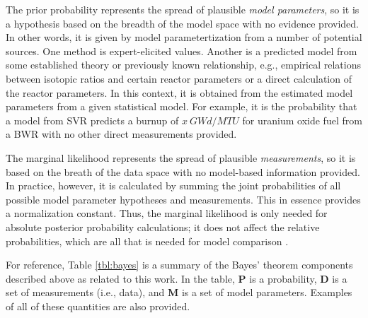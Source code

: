 The prior probability represents the spread of plausible \textit{model
parameters}, so it is a hypothesis based on the breadth of the model space with
no evidence provided.  In other words, it is given by model parametertization
from a number of potential sources.  One method is expert-elicited values.
Another is a predicted model from some established theory or previously known
relationship, e.g., empirical relations between isotopic ratios and certain
reactor parameters or a direct calculation of the reactor parameters. In this
context, it is obtained from the estimated model parameters from a given
statistical model.  For example, it is the probability that a model from
\gls{SVR} predicts a burnup of $x\ GWd/MTU$ for uranium oxide fuel from a
\gls{BWR} with no other direct measurements provided.

The marginal likelihood represents the spread of plausible
\textit{measurements}, so it is based on the breath of the data space with no
model-based information provided.  In practice, however, it is calculated by
summing the joint probabilities of all possible model parameter hypotheses and
measurements. This in essence provides a normalization constant.  Thus, the
marginal likelihood is only needed for absolute posterior probability
calculations; it does not affect the relative probabilities, which are all that
is needed for model comparison \cite{inverse_theory}. 

For reference, Table \ref{tbl:bayes} is a summary of the Bayes' theorem
components described above as related to this work. In the table, \textbf{P} is
a probability, \textbf{D} is a set of measurements (i.e., data), and \textbf{M}
is a set of model parameters. Examples of all of these quantities are also
provided.

